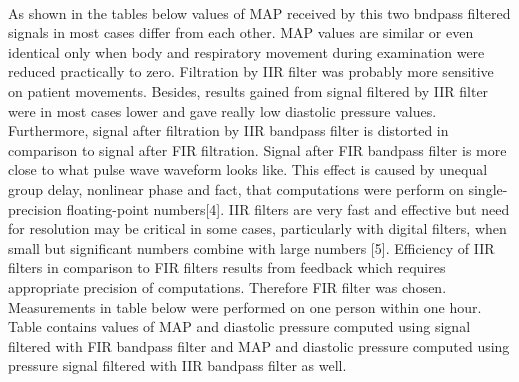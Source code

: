  ~\newline


As shown in the tables below values of M\+AP received by this two bndpass filtered signals in most cases differ from each other. M\+AP values are similar or even identical only when body and respiratory movement during examination were reduced practically to zero. Filtration by I\+IR filter was probably more sensitive on patient movements. Besides, results gained from signal filtered by I\+IR filter were in most cases lower and gave really low diastolic pressure values. Furthermore, signal after filtration by I\+IR bandpass filter is distorted in comparison to signal after F\+IR filtration. Signal after F\+IR bandpass filter is more close to what pulse wave waveform looks like. This effect is caused by unequal group delay, nonlinear phase and fact, that computations were perform on single-\/precision floating-\/point numbers\mbox{[}4\mbox{]}. I\+IR filters are very fast and effective but need for resolution may be critical in some cases, particularly with digital filters, when small but significant numbers combine with large numbers \mbox{[}5\mbox{]}. Efficiency of I\+IR filters in comparison to F\+IR filters results from feedback which requires appropriate precision of computations. Therefore F\+IR filter was chosen. ~\newline
 Measurements in table below were performed on one person within one hour. Table contains values of M\+AP and diastolic pressure computed using signal filtered with F\+IR bandpass filter and M\+AP and diastolic pressure computed using pressure signal filtered with I\+IR bandpass filter as well.


